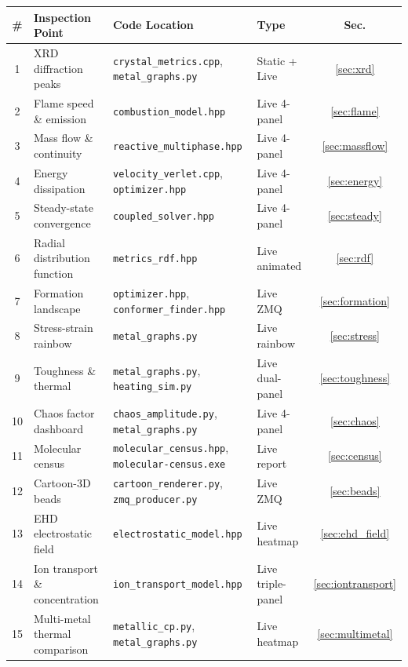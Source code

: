 \documentclass[11pt,a4paper]{article}
\begin{document}
\begin{center}
\small
\begin{tabular}{clllc}
\toprule
\textbf{\#} & \textbf{Inspection Point} & \textbf{Code Location} &
\textbf{Type} & \textbf{Sec.} \\
\midrule
1 & XRD diffraction peaks &
    \texttt{crystal\_metrics.cpp}, \texttt{metal\_graphs.py} &
    Static + Live & \ref{sec:xrd} \\
2 & Flame speed \& emission &
    \texttt{combustion\_model.hpp} &
    Live 4-panel & \ref{sec:flame} \\
3 & Mass flow \& continuity &
    \texttt{reactive\_multiphase.hpp} &
    Live 4-panel & \ref{sec:massflow} \\
4 & Energy dissipation &
    \texttt{velocity\_verlet.cpp}, \texttt{optimizer.hpp} &
    Live 4-panel & \ref{sec:energy} \\
5 & Steady-state convergence &
    \texttt{coupled\_solver.hpp} &
    Live 4-panel & \ref{sec:steady} \\
6 & Radial distribution function &
    \texttt{metrics\_rdf.hpp} &
    Live animated & \ref{sec:rdf} \\
7 & Formation landscape &
    \texttt{optimizer.hpp}, \texttt{conformer\_finder.hpp} &
    Live ZMQ & \ref{sec:formation} \\
8 & Stress-strain rainbow &
    \texttt{metal\_graphs.py} &
    Live rainbow & \ref{sec:stress} \\
9 & Toughness \& thermal &
    \texttt{metal\_graphs.py}, \texttt{heating\_sim.py} &
    Live dual-panel & \ref{sec:toughness} \\
10 & Chaos factor dashboard &
    \texttt{chaos\_amplitude.py}, \texttt{metal\_graphs.py} &
    Live 4-panel & \ref{sec:chaos} \\
11 & Molecular census &
    \texttt{molecular\_census.hpp}, \texttt{molecular-census.exe} &
    Live report & \ref{sec:census} \\
12 & Cartoon-3D beads &
    \texttt{cartoon\_renderer.py}, \texttt{zmq\_producer.py} &
    Live ZMQ & \ref{sec:beads} \\
13 & EHD electrostatic field &
    \texttt{electrostatic\_model.hpp} &
    Live heatmap & \ref{sec:ehd_field} \\
14 & Ion transport \& concentration &
    \texttt{ion\_transport\_model.hpp} &
    Live triple-panel & \ref{sec:iontransport} \\
15 & Multi-metal thermal comparison &
    \texttt{metallic\_cp.py}, \texttt{metal\_graphs.py} &
    Live heatmap & \ref{sec:multimetal} \\
\bottomrule
\end{tabular}
\end{center}
\end{document}
